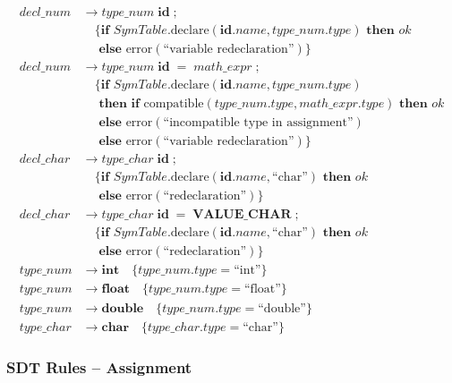 \documentclass[letterpaper,12pt,oneside]{article}
\begin{document}
\begin{align*}
decl\_num &\rightarrow type\_num \; \mathbf{id} \; \mathbf{;} \\
         &\quad \{\textbf{if } SymTable.\text{declare}(\mathbf{id}.name, type\_num.type) \textbf{ then } ok \\
         &\quad \textbf{ else } \text{error}(\text{``variable redeclaration''})\} \\[10pt]
decl\_num &\rightarrow type\_num \; \mathbf{id} \; \mathbf{=} \; math\_expr \; \mathbf{;} \\
         &\quad \{\textbf{if } SymTable.\text{declare}(\mathbf{id}.name, type\_num.type) \\
         &\quad \textbf{ then if } \text{compatible}(type\_num.type, math\_expr.type) \textbf{ then } ok \\
         &\quad \textbf{ else } \text{error}(\text{``incompatible type in assignment''}) \\
         &\quad \textbf{ else } \text{error}(\text{``variable redeclaration''})\} \\[10pt]
decl\_char &\rightarrow type\_char \; \mathbf{id} \; \mathbf{;} \\
          &\quad \{\textbf{if } SymTable.\text{declare}(\mathbf{id}.name, \text{``char''}) \textbf{ then } ok \\
          &\quad \textbf{ else } \text{error}(\text{``redeclaration''})\} \\[10pt]
decl\_char &\rightarrow type\_char \; \mathbf{id} \; \mathbf{=} \; \mathbf{VALUE\_CHAR} \; \mathbf{;} \\
          &\quad \{\textbf{if } SymTable.\text{declare}(\mathbf{id}.name, \text{``char''}) \textbf{ then } ok \\
          &\quad \textbf{ else } \text{error}(\text{``redeclaration''})\} \\[10pt]
type\_num &\rightarrow \mathbf{int} \quad \{type\_num.type = \text{``int''}\} \\
type\_num &\rightarrow \mathbf{float} \quad \{type\_num.type = \text{``float''}\} \\
type\_num &\rightarrow \mathbf{double} \quad \{type\_num.type = \text{``double''}\} \\[6pt]
type\_char &\rightarrow \mathbf{char} \quad \{type\_char.type = \text{``char''}\}
\end{align*}

\subsubsection{SDT Rules -- Assignment}
\end{document}
